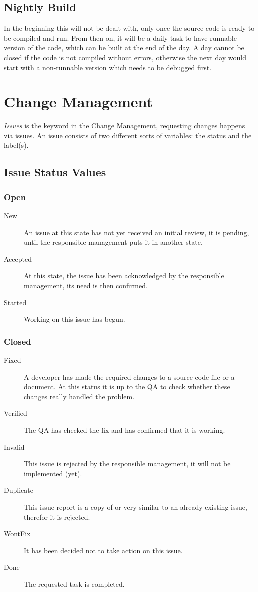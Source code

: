 \documentclass{report}
\begin{document}
\section{Nightly Build}
In the beginning this will not be dealt with, only once the source code is ready to be compiled and run.
From then on, it will be a daily task to have runnable version of the code, which can be built at the end of the day.
A day cannot be closed if the code is not compiled without errors, otherwise the next day would start with a non-runnable version which needs to be debugged first.



\chapter{Change Management}
{\it Issues} is the keyword in the Change Management, requesting changes happens via issues.
An issue consists of two different sorts of variables: the status and the label(s).

\section{Issue Status Values}
\subsection{Open}
\begin{description}
\item[New]
An issue at this state has not yet received an initial review, it is pending, until the responsible management puts it in another state.
\item[Accepted]
At this state, the issue has been acknowledged by the responsible management, its need is then confirmed.
\item[Started]
Working on this issue has begun.
\end{description}
\subsection{Closed}
\begin{description}
\item[Fixed]
A developer has made the required changes to a source code file or a document.
At this status it is up to the QA to check whether these changes really handled the problem.
\item[Verified]
The QA has checked the fix and has confirmed that it is working.
\item[Invalid]
This issue is rejected by the responsible management, it will not be implemented (yet).
\item[Duplicate]
This issue report is a copy of or very similar to an already existing issue, therefor it is rejected.
\item[WontFix]
It has been decided not to take action on this issue.
\item[Done]
The requested task is completed.
\end{description}
\end{document}
